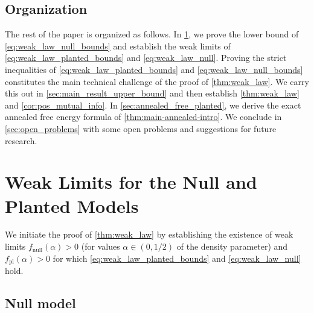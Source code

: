 \documentclass[11pt]{amsart}
\numberwithin{equation}{section}
\numberwithin{equation}{section}
\newcommand{\1}{\mathbbm{1}}
\newcommand{\fpl}{f_{\mathrm{pl}}}
\newcommand{\fnull}{f_{\mathrm{null}}}
\theoremstyle{definition}
\begin{document}
\subsection{Organization} The rest of the paper is organized as follows. In \cref{sec:weak_law_existence}, we prove the lower bound of \eqref{eq:weak_law_null_bounds} and establish the weak limits of \eqref{eq:weak_law_planted_bounds} and \eqref{eq:weak_law_null}. Proving the strict inequalities of \eqref{eq:weak_law_planted_bounds} and \eqref{eq:weak_law_null_bounds} constitutes the main technical challenge of the proof of \cref{thm:weak_law}. We carry this out in \cref{sec:main_result_upper_bound} and then establish \cref{thm:weak_law} and \cref{cor:pos_mutual_info}. In \cref{sec:annealed_free_planted}, we derive the exact annealed free energy formula of \cref{thm:main-annealed-intro}. We conclude in \cref{sec:open_problems} with some open problems and suggestions for future research.

\section{Weak Limits for the Null and Planted Models} \label{sec:weak_law_existence}

We initiate the proof of \cref{thm:weak_law} by establishing the existence of weak limits $\fnull(\alpha) > 0$ (for values $\alpha \in (0,1/2)$ of the density parameter) and $\fpl(\alpha) > 0$ for which \eqref{eq:weak_law_planted_bounds} and \eqref{eq:weak_law_null} hold.

\subsection{Null model} \label{subsec:null_model}
\end{document}
